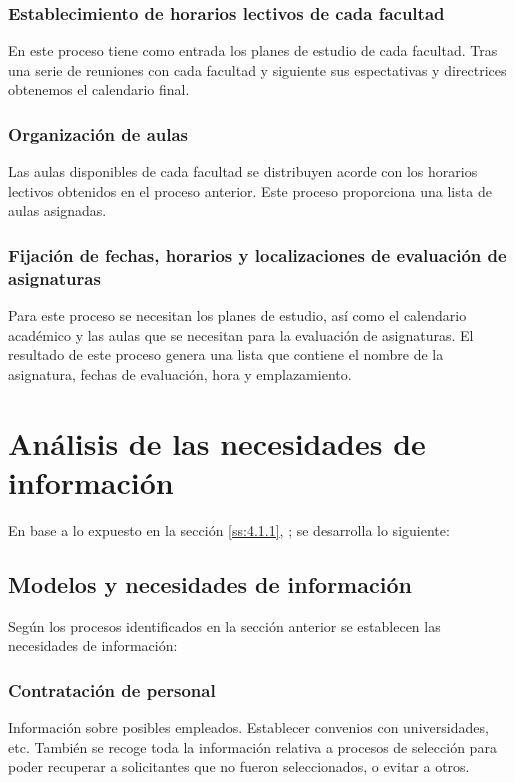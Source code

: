 \documentclass[11pt,a4paper,spanish,twoside]{book}
\begin{document}
\subsubsection{Establecimiento de horarios lectivos de cada facultad}
En este proceso tiene como entrada los planes de estudio de cada
facultad. Tras una serie de reuniones con cada facultad y siguiente sus
espectativas y directrices obtenemos el calendario final.

\subsubsection{Organización de aulas}
Las aulas disponibles de cada facultad se distribuyen acorde con los horarios
lectivos obtenidos en el proceso anterior. Este proceso proporciona una
lista de aulas asignadas. 

\subsubsection{Fijación de fechas, horarios y localizaciones de evaluación de
  asignaturas}
Para este proceso se necesitan los planes de estudio, así como el calendario
académico y las aulas que se necesitan para la evaluación de asignaturas. El
resultado de este proceso genera una lista que contiene el nombre de la
asignatura, fechas de evaluación, hora y emplazamiento. 

\section{Análisis de las necesidades de información} 
En base a lo expuesto 
en la sección \vref{ss:4.1.1}, \emph{}; 
se desarrolla lo siguiente:

\subsection{Modelos y necesidades de información} \label{ss:4.2.1}
Según los procesos identificados en la sección anterior se establecen las
necesidades de información: 

\subsubsection{Contratación de personal}
Información sobre posibles empleados. Establecer convenios con universidades,
etc. También se recoge toda la información relativa a procesos de
selección para poder recuperar a solicitantes que no fueron seleccionados, o
evitar a otros.  
\end{document}

